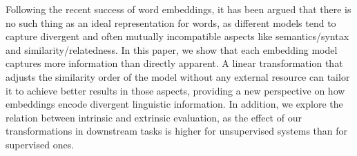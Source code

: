 Following the recent success of word embeddings, it has been argued that there is no such thing as an ideal representation for words, as different models tend to capture divergent and often mutually incompatible aspects like semantics/syntax and similarity/relatedness. In this paper, we show that each embedding model captures more information than directly apparent. A linear transformation that adjusts the similarity order of the model without any external resource can tailor it to achieve better results in those aspects, providing a new perspective on how embeddings encode divergent linguistic information. In addition, we explore the relation between intrinsic and extrinsic evaluation, as the effect of our transformations in downstream tasks is higher for unsupervised systems than for supervised ones.

